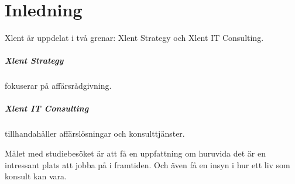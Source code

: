 \documentclass[../report.tex]{subfiles}
\begin{document}
    \chapter{Inledning}
    Xlent är uppdelat i två grenar: Xlent Strategy och Xlent IT Consulting.
    
    \paragraph{Xlent Strategy} fokuserar på affärsrådgivning.
    
    \paragraph{Xlent IT Consulting} tillhandahåller affärslösningar och konsulttjänster.
    
    \bigskip
    
    Målet med studiebesöket är att få en uppfattning om huruvida det är en intressant plats att jobba på i framtiden. Och även få en insyn i hur ett liv som konsult kan vara.
\end{document}
